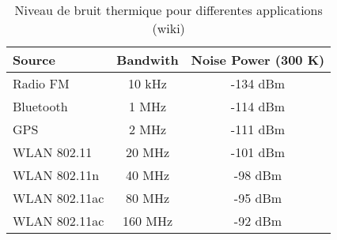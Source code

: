 \begin{table}
    \caption{Niveau de bruit thermique pour differentes applications (wiki)}
    \label{tab:thermal-noise}
    \begin{tabular}{l|c|c}
        \toprule
        Source & Bandwith & Noise Power (300 K) \\
        \midrule
        \hline
        Radio FM & 10 kHz & -134 dBm \\
        Bluetooth & 1 MHz & -114 dBm \\
        GPS & 2 MHz & -111 dBm \\
        WLAN 802.11 & 20 MHz & -101 dBm \\
        WLAN 802.11n & 40 MHz & -98 dBm \\
        WLAN 802.11ac & 80 MHz & -95 dBm \\
        WLAN 802.11ac & 160 MHz & -92 dBm \\
        \bottomrule
    \end{tabular}
\end{table}